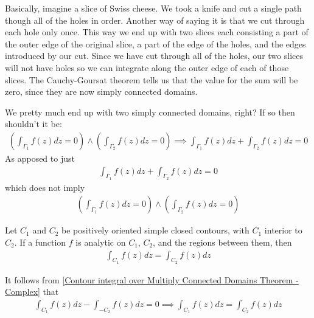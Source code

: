 \documentclass[12pt, english]{book}
\makeatletter
\renewenvironment{proof}[1][\proofname]{\par
	\pushQED{\qed}%
	\normalfont \topsep6\p@\@plus6\p@\relax
	\list{}{%
		\settowidth{\leftmargin}{\itshape\proofname:\hskip\labelsep}%
		\setlength{\labelwidth}{0pt}%
		\setlength{\itemindent}{-\leftmargin}%
	}%
	\item[\hskip\labelsep\itshape#1\@addpunct{:}]\ignorespaces
	}{ \popQED\endlist\@endpefalse}
\makeatother
\begin{document}
	\begin{observation}
		Basically, imagine a slice of Swiss cheese. We took a knife and cut a single path though all of the holes in order. Another way of saying it is that we cut through each hole only once. This way we end up with two slices each consisting a part of the outer edge of the original slice, a part of the edge of the holes, and the edges introduced by our cut. Since we have cut through all of the holes, our two slices will not have holes so we can integrate along the outer edge of each of those slices. The Cauchy-Goursat theorem tells us that the value for the sum will be zero, since they are now simply connected domains. 
	\end{observation}
	
	\begin{question}
		We pretty much end up with two simply connected domains, right? If so then shouldn't it be:
		\begin{align*}
			\left( \int_{\Gamma_1} f(z) dz = 0 \right) \land \left( \int_{\Gamma_2} f(z) dz = 0 \right) \implies \int_{\Gamma_1} f(z) dz + \int_{\Gamma_2} f(z) dz = 0
		\end{align*}
		As apposed to just 
		\begin{align*}
			\int_{\Gamma_1} f(z) dz + \int_{\Gamma_2} f(z) dz = 0
		\end{align*}
		which does not imply
		\begin{align*}
			\left( \int_{\Gamma_1} f(z) dz = 0 \right) \land \left( \int_{\Gamma_2} f(z) dz = 0 \right)
		\end{align*}
	\end{question}

	\begin{corollary}
		\label{Principle of Deformation of Paths Corollary - Complex}
		Let \(C_1\) and \(C_2\) be positively oriented simple closed contours, with \(C_1\) interior to \(C_2\). If a function \(f\) is analytic on \(C_1\), \(C_2\), and the regions between them, then 
		\begin{align*}
			\int_{C_1} f(z) dz = \int_{C_2} f(z) dz
		\end{align*}
	\end{corollary}
	\begin{proof}
		It follows from \cref{Contour integral over Multiply Connected Domains Theorem - Complex} that 
		\begin{align*}
			\int_{C_1} f(z) dz - \int_{-C_2} f(z) dz = 0
			\implies \int_{C_1} f(z) dz = \int_{C_2} f(z) dz
		\end{align*}
	\end{proof}
\end{document}
